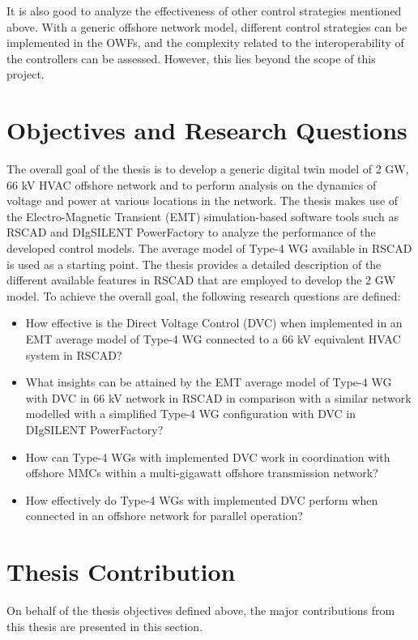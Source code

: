 It is also good to analyze the effectiveness of other control strategies mentioned above. With a generic offshore network model, different control strategies can be implemented in the \gls{OWF}s, and the complexity related to the interoperability of the controllers can be assessed. However, this lies beyond the scope of this project.

\section{Objectives and Research Questions}
The overall goal of the thesis is to develop a generic digital twin model of 2 GW, 66 kV \gls{HVAC} offshore network and to perform analysis on the dynamics of voltage and power at various locations in the network. The thesis makes use of the Electro-Magnetic Transient (\gls{EMT}) simulation-based software tools such as RSCAD and DIgSILENT PowerFactory to analyze the performance of the developed control models. The average model of Type-4 \gls{WG} available in RSCAD is used as a starting point. The thesis provides a detailed description of the different available features in RSCAD that are employed to develop the 2 GW model. 
To achieve the overall goal, the following research questions are defined:
\begin{itemize}
    \item How effective is the Direct Voltage Control (\gls{DVC}) when implemented in an \gls{EMT} average model of Type-4 \gls{WG} connected to a 66 kV equivalent \gls{HVAC} system in RSCAD?
    
    \item What insights can be attained by the \gls{EMT} average model of Type-4 \gls{WG} with \gls{DVC} in 66 kV network in RSCAD in comparison with a similar network modelled with a simplified Type-4 \gls{WG} configuration with \gls{DVC} in DIgSILENT PowerFactory?
    
    \item How can Type-4 \gls{WG}s with implemented \gls{DVC} work in coordination with offshore \gls{MMC}s within a multi-gigawatt offshore transmission network?
    
    \item How effectively do Type-4 \gls{WG}s with implemented \gls{DVC} perform when connected in an offshore network for parallel operation?

\end{itemize}

\section{Thesis Contribution}
On behalf of the thesis objectives defined above, the major contributions from this thesis are presented in this section.

